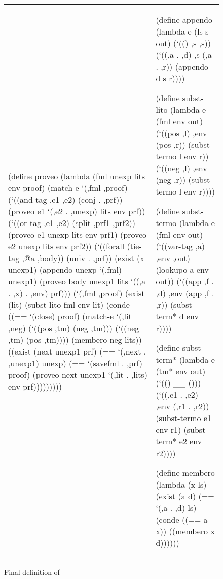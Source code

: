 \begin{figure}[H]
\hspace{-.1in}
\begin{tabular}{l l}
\begin{minipage}{1.8in}
\begin{schemedisplay}
(define proveo
  (lambda (fml unexp lits env proof)
    (match-e `(,fml ,proof)
      (`((and-tag ,e1 ,e2) (conj . ,prf))
       (proveo e1 `(,e2 . ,unexp)
               lits env prf))
      (`((or-tag ,e1 ,e2) (split ,prf1 ,prf2))
       (proveo e1 unexp lits env prf1)
       (proveo e2 unexp lits env prf2))
      (`((forall (tie-tag ,@a ,body)) (univ . ,prf))
       (exist (x unexp1)
         (appendo unexp `(,fml) unexp1)
         (proveo body unexp1 lits
                 `((,a . ,x) . ,env) prf)))
      (`(,fml ,proof)
       (exist (lit)
         (subst-lito fml env lit)         
         (conde
           ((== `(close) proof)
            (match-e `(,lit ,neg)
              (`((pos ,tm) (neg ,tm)))
              (`((neg ,tm) (pos ,tm))))              
            (membero neg lits))
           ((exist (next unexp1 prf)
              (== `(,next . ,unexp1) unexp)
              (== `(savefml . ,prf) proof)
              (proveo next unexp1 `(,lit . ,lits)
                      env prf)))))))))
\end{schemedisplay}
\end{minipage}

& 

\hspace{-0.3in}
\begin{minipage}{1.8in}
\begin{schemedisplay}
(define appendo
  (lambda-e (ls s out)
    (`(() ,s ,s))
    (`((,a . ,d) ,s (,a . ,r))
     (appendo d s r))))

(define subst-lito
  (lambda-e (fml env out)
    (`((pos ,l) ,env (pos ,r))
     (subst-termo l env r))
    (`((neg ,l) ,env (neg ,r))
     (subst-termo l env r))))

(define subst-termo
  (lambda-e (fml env out)
    (`((var-tag ,a) ,env ,out)
     (lookupo a env out))
    (`((app ,f . ,d) ,env (app ,f . ,r))
     (subst-term* d env r))))

(define subst-term*
  (lambda-e (tm* env out)
    (`(() __ ()))
    (`((,e1 . ,e2) ,env (,r1 . ,r2))
     (subst-termo e1 env r1)
     (subst-term* e2 env r2))))

(define membero
  (lambda (x ls)
    (exist (a d)
      (== `(,a . ,d) ls)
      (conde
        ((== a x))
        ((membero x d))))))
\end{schemedisplay}
\end{minipage}

\end{tabular}
\caption{Final definition of \alphatap
  \label{fig:ending}}
\end{figure}

